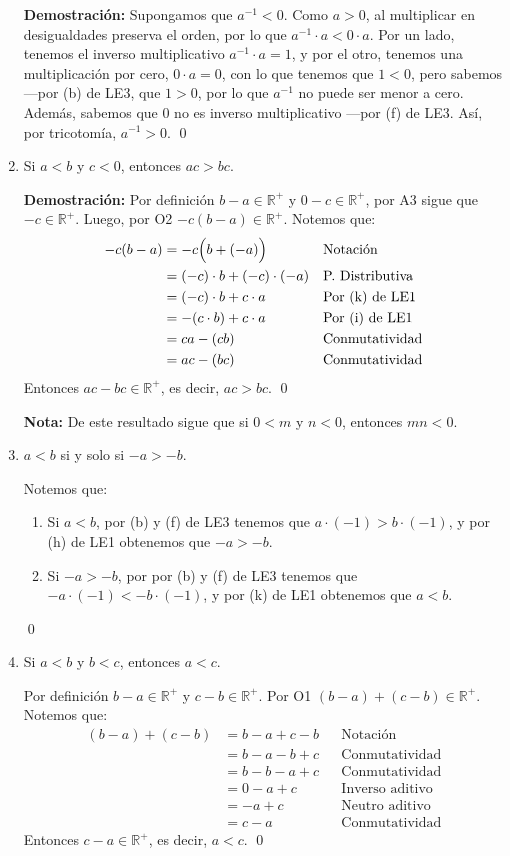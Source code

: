 \documentclass[11pt]{article}
\newcommand{\R}{\mathbb{R}}
\begin{document}
\begin{enumerate}[label=\alph*)]
    \textbf{Demostración:} Supongamos que $a^{-1}<0$. Como $a>0$, al multiplicar en desigualdades preserva el orden, por lo que $a^{-1} \cdot a<0 \cdot a$. Por un lado, tenemos el inverso multiplicativo $a^{-1} \cdot a = 1$, y por el otro, tenemos una multiplicación por cero, $0\cdot a=0$, con lo que tenemos que $1<0$, pero sabemos —por (b) de LE3, que $1>0$, por lo que $a^{-1}$ no puede ser menor a cero. Además, sabemos que $0$ no es inverso multiplicativo —por (f) de LE3. Así, por tricotomía, $a^{-1}>0$. \qed

    \item Si $a<b$ y $c<0$, entonces $ac>bc$.
    
    \textbf{Demostración:} Por definición $b-a \in \R^+$ y $0 - c \in \R^+$, por A3 sigue que $ -c \in \R^+$. Luego, por O2 $-c(b-a) \in \R^+$. Notemos que:
    \begin{align*}
    -c(b-a) &= -c \Bigl( b + (-a) \Bigr) && \text{Notación}\\
    &= (-c) \cdot b + (-c) \cdot (-a) && \text{P. Distributiva}\\
    &= (-c) \cdot b + c \cdot a && \text{Por (k) de LE1}\\
    &= -(c \cdot b) + c \cdot a && \text{Por (i) de LE1}\\
    &= ca -(cb) && \text{Conmutatividad}\\
    &= ac - (bc) && \text{Conmutatividad}
    \end{align*}
    Entonces $ac - bc \in \R^+$, es decir, $ac>bc$. \qed

    \textbf{Nota:} De este resultado sigue que si $0<m$ y $n<0$, entonces $mn<0$.

    \item $a<b$ si y solo si $-a>-b$.
    
    Notemos que:
    \begin{enumerate}[label=\roman*)]
        \item Si $a<b$, por (b) y (f) de LE3 tenemos que $a \cdot (-1) > b \cdot (-1)$, y por (h) de LE1 obtenemos que $-a > -b$.
        \item Si $-a > -b$, por por (b) y (f) de LE3 tenemos que $-a \cdot (-1) < -b \cdot (-1)$, y por (k) de LE1 obtenemos que $a<b$.
    \end{enumerate} \qed

    \item Si $a<b$ y $b<c$, entonces $a<c$.
    
    Por definición $b-a \in \R^+$ y $c-b \in \R^+$. Por O1 $(b-a) + (c-b) \in \R^+$. Notemos que:
    \begin{align*}
        (b-a) + (c-b) &= b - a + c -b && \text{Notación}\\
        &= b-a -b+c && \text{Conmutatividad}\\
        &= b-b -a+c && \text{Conmutatividad}\\
        &= 0 - a +c && \text{Inverso aditivo}\\
        &= -a +c && \text{Neutro aditivo}\\
        &= c-a && \text{Conmutatividad}
    \end{align*} Entonces $c-a \in \R^+$, es decir, $a<c$. \qed
    



\end{enumerate}
\end{document}
